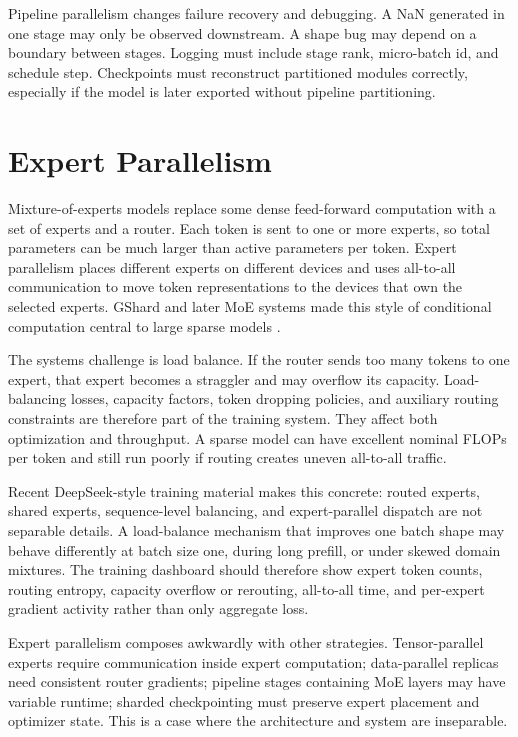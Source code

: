 Pipeline parallelism changes failure recovery and debugging. A NaN generated in one stage may only be observed downstream. A shape bug may depend on a boundary between stages. Logging must include stage rank, micro-batch id, and schedule step. Checkpoints must reconstruct partitioned modules correctly, especially if the model is later exported without pipeline partitioning.

\section{Expert Parallelism}
\label{sec:expert-parallelism}

Mixture-of-experts models replace some dense feed-forward computation with a set of experts and a router. Each token is sent to one or more experts, so total parameters can be much larger than active parameters per token. Expert parallelism places different experts on different devices and uses all-to-all communication to move token representations to the devices that own the selected experts. GShard and later MoE systems made this style of conditional computation central to large sparse models \cite{lepikhin2020gshard,deepseek2024v3}.

The systems challenge is load balance. If the router sends too many tokens to one expert, that expert becomes a straggler and may overflow its capacity. Load-balancing losses, capacity factors, token dropping policies, and auxiliary routing constraints are therefore part of the training system. They affect both optimization and throughput. A sparse model can have excellent nominal FLOPs per token and still run poorly if routing creates uneven all-to-all traffic.

Recent DeepSeek-style training material makes this concrete: routed experts, shared experts, sequence-level balancing, and expert-parallel dispatch are not separable details. A load-balance mechanism that improves one batch shape may behave differently at batch size one, during long prefill, or under skewed domain mixtures. The training dashboard should therefore show expert token counts, routing entropy, capacity overflow or rerouting, all-to-all time, and per-expert gradient activity rather than only aggregate loss.

Expert parallelism composes awkwardly with other strategies. Tensor-parallel experts require communication inside expert computation; data-parallel replicas need consistent router gradients; pipeline stages containing MoE layers may have variable runtime; sharded checkpointing must preserve expert placement and optimizer state. This is a case where the architecture and system are inseparable.

